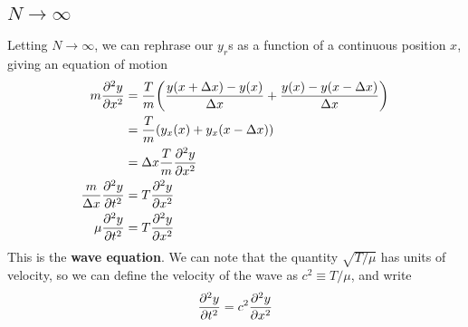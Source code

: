 \subsection*{$N\to\infty$}
Letting $N\to\infty$, we can rephrase our $y_r$s as a function of a continuous position $x$, giving an equation of motion 
\begin{align*}
    m\pdv[2]{y}{x} &= \frac{T}{m}\pqty{\frac{y(x+\Delta x)-y(x)}{\Delta x} + \frac{y(x)-y(x-\Delta x)}{\Delta x}} \\
    &= \frac{T}{m}\pqty{y_x(x) + y_x(x-\Delta x)} \\
    &= \Delta x\frac{T}{m} \pdv[2]{y}{x} \\
    \frac{m}{\Delta x} \pdv[2]{y}{t} &= T\pdv[2]{y}{x} \\
    \mu\pdv[2]{y}{t} &= T\pdv[2]{y}{x}
\end{align*}
This is the \textbf{wave equation}. We can note that the quantity $\sqrt{T/\mu}$ has units of velocity, so we can define the velocity of the wave as $c^2\equiv T/\mu $, and write
\[ \pdv[2]{y}{t} = c^2\pdv[2]{y}{x} \]
